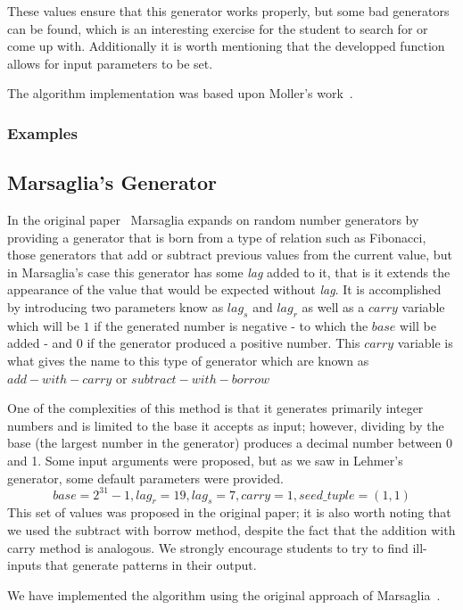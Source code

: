 These values ensure that this generator works properly, but some bad generators can be found, which is an interesting exercise for the student to search for or come up with. Additionally it is worth mentioning that the developped function allows for input parameters to be set.

The algorithm implementation was based upon Moller's work~\cite{doi:10.1137/1.9780898717952}.
\subsubsection{Examples}
	


\subsection{Marsaglia's Generator}

In the original paper~\cite{10.1214/aoap/1177005878} Marsaglia expands on random number generators by providing a generator that is born from a type of relation such as Fibonacci, those generators that add or subtract previous values from the current value, but in Marsaglia's case this generator has some \textit{lag} added to it, that is it extends the appearance of the value that would be expected without \textit{lag}. It is accomplished by introducing two parameters know as $lag_s$ and $lag_r$ as well as a $carry$ variable which will be $1$ if the generated number is negative - to which the $base$ will be added - and $0$ if the generator produced a positive number. This $carry$ variable is what gives the name to this type of generator which are known as $add-with-carry$ or $subtract-with-borrow$

One of the complexities of this method is that it generates primarily integer numbers and is limited to the base it accepts as input; however, dividing by the base (the largest number in the generator) produces a decimal number between 0 and 1. Some input arguments were proposed, but as we saw in Lehmer's generator, some default parameters were provided. 
\[base = 2^{31}-1, lag_r=19, lag_s=7, carry=1, seed\_tuple = (1,1)\]
This set of values was proposed in the original paper; it is also worth noting that we used the subtract with borrow method, despite the fact that the addition with carry method is analogous. We strongly encourage students to try to find ill-inputs that generate patterns in their output.

We have implemented the algorithm using the original approach of Marsaglia~\cite{10.1214/aoap/1177005878}.
